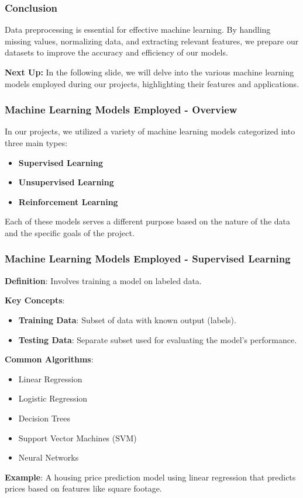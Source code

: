 \documentclass[aspectratio=169]{beamer}
\begin{document}
\begin{frame}[fragile]
  \frametitle{Conclusion}

  Data preprocessing is essential for effective machine learning. 
  By handling missing values, normalizing data, and extracting relevant features, 
  we prepare our datasets to improve the accuracy and efficiency of our models.

  \textbf{Next Up:} In the following slide, we will delve into the various machine learning models employed during our projects, highlighting their features and applications.
\end{frame}

\begin{frame}[fragile]
    \frametitle{Machine Learning Models Employed - Overview}
    In our projects, we utilized a variety of machine learning models categorized into three main types:
    \begin{itemize}
        \item \textbf{Supervised Learning}
        \item \textbf{Unsupervised Learning}
        \item \textbf{Reinforcement Learning}
    \end{itemize}
    Each of these models serves a different purpose based on the nature of the data and the specific goals of the project.
\end{frame}

\begin{frame}[fragile]
    \frametitle{Machine Learning Models Employed - Supervised Learning}
    \textbf{Definition}: Involves training a model on labeled data.
    
    \textbf{Key Concepts}:
    \begin{itemize}
        \item \textbf{Training Data}: Subset of data with known output (labels).
        \item \textbf{Testing Data}: Separate subset used for evaluating the model's performance.
    \end{itemize}

    \textbf{Common Algorithms}:
    \begin{itemize}
        \item Linear Regression
        \item Logistic Regression
        \item Decision Trees
        \item Support Vector Machines (SVM)
        \item Neural Networks
    \end{itemize}
    
    \textbf{Example}:
    A housing price prediction model using linear regression that predicts prices based on features like square footage.
\end{frame}
\end{document}
